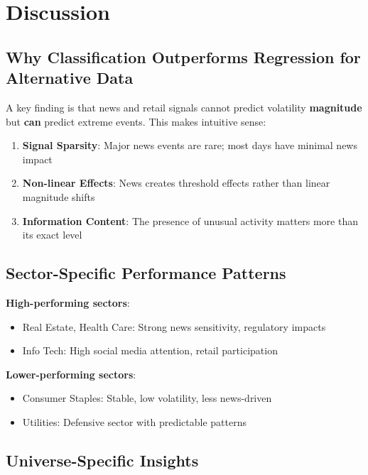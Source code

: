 \documentclass[12pt,a4paper]{article}
\begin{document}
\section{Discussion}

\subsection{Why Classification Outperforms Regression for Alternative Data}

A key finding is that news and retail signals cannot predict volatility \textbf{magnitude} but \textbf{can} predict extreme events. This makes intuitive sense:

\begin{enumerate}
    \item \textbf{Signal Sparsity}: Major news events are rare; most days have minimal news impact
    \item \textbf{Non-linear Effects}: News creates threshold effects rather than linear magnitude shifts
    \item \textbf{Information Content}: The presence of unusual activity matters more than its exact level
\end{enumerate}

\subsection{Sector-Specific Performance Patterns}

\textbf{High-performing sectors}:
\begin{itemize}
    \item Real Estate, Health Care: Strong news sensitivity, regulatory impacts
    \item Info Tech: High social media attention, retail participation
\end{itemize}

\textbf{Lower-performing sectors}:
\begin{itemize}
    \item Consumer Staples: Stable, low volatility, less news-driven
    \item Utilities: Defensive sector with predictable patterns
\end{itemize}

\subsection{Universe-Specific Insights}
\end{document}
